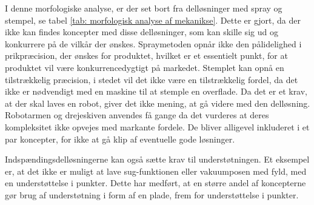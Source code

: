 I denne morfologiske analyse, er der set bort fra delløsninger med spray og stempel, se tabel \ref{tab: morfologisk analyse af mekanikse}. Dette er gjort, da der ikke kan findes koncepter med disse delløsninger, som kan skille sig ud og konkurrere på de vilkår der ønskes. Spraymetoden opnår ikke den pålidelighed i prikpræcision, der ønskes for produktet, hvilket er et essentielt punkt, for at produktet vil være konkurrencedygtigt på markedet. Stemplet kan opnå en tilstrækkelig præcision, i stedet vil det ikke være en tilstrækkelig fordel, da det ikke er nødvendigt med en maskine til at stemple en overflade. Da det er et krav, at der skal laves en robot, giver det ikke mening, at gå videre med den delløsning. Robotarmen og drejeskiven anvendes få gange da det vurderes at deres kompleksitet ikke opvejes med markante fordele. De bliver alligevel inkluderet i et par koncepter, for ikke at gå klip af eventuelle gode løsninger.

Indspændingsdelløsningerne kan også sætte krav til understøtningen. Et eksempel er, at det ikke er muligt at lave sug-funktionen eller vakuumposen med fyld, med en understøttelse i punkter. Dette har medført, at en større andel af koncepterne gør brug af understøtning i form af en plade, frem for understøttelse i punkter. 




